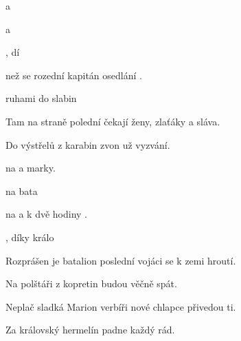 

 a 

  

  a  

, dí

\zs
{} než se rozední
kapitán  osedlání  .

ruhami do slabin  

Tam na straně polední
čekají ženy, zlaťáky a sláva.

Do výstřelů z karabin zvon už vyzvání.
\ks

\zr
{} na  a  marky.

 na  bata 

 na  a k  dvě hodiny .

, díky  králo 
\kr

\zs
Rozprášen je batalion
poslední vojáci se k zemi hroutí.

Na polštáři z kopretin budou věčně spát.

Neplač sladká Marion
verbíři nové chlapce přivedou ti.

Za královský hermelín padne každý rád.
\ks

\zr  \kr

\kp





